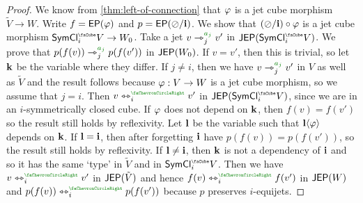 \documentclass[a4paper]{memoir}
\begin{document}
\begin{proof}
	We know from \cref{thm:left-of-connection} that $\varphi$ is a jet cube morphism $\tilde V \to W$.
	Write $f = \mathsf{EP}(\varphi)$ and $p = \mathsf{EP}(\oslash / \mathbf{i})$.
	We show that $(\oslash/\mathbf{i}) \circ \varphi$ is a jet cube morphism $\UFsymcube_i V \to W_0$.
	Take a jet $v \jet_j\pmr{a_j} v'$ in $\JEP(\UFsymcube_i V)$.
	We prove that $p(f(v)) \jet_j\pmr{a_j} p(f(v'))$ in $\mathsf{JEP}(W_0)$.
	If $v = v'$, then this is trivial, so let $\mathbf{k}$ be the variable where they differ.
	If $j \neq i$, then we have $v \jet_j\pmr{a_j} v'$ in $V$ as well as $\tilde V$ and the result follows because $\varphi : V \to W$ is a jet cube morphism, so we assume that $j = i$.
	Then $v \equijet_i\pmr{\ypolar} v'$ in $\JEP(\UFsymcube_i V)$, since we are in an $i$-symmetrically closed cube.
	If $\varphi$ does not depend on $\mathbf{k}$, then $f(v) = f(v')$ so the result still holds by reflexivity.
	Let $\mathbf{l}$ be the variable such that $\mathbf{l} \langle \varphi \rangle$ depends on $\mathbf{k}$.
	If $\mathbf{l} = \mathbf{i}$, then after forgetting $\mathbf{i}$ have $p(f(v)) = p(f(v'))$, so the result still holds by reflexivity.
	If $\mathbf{l} \neq \mathbf{i}$, then $\mathbf{k}$ is not a dependency of $\mathbf{i}$ and so it has the same `type' in $\tilde V$ and in $\UFsymcube_i V$.
	Then we have $v \equijet_i\pmr{\ypolar} v'$ in $\mathsf{JEP}(\tilde V)$ and hence $f(v) \equijet_i\pmr{\ypolar} f(v')$ in $\mathsf{JEP}(W)$ and $p(f(v)) \equijet_i\pmr{\ypolar} p(f(v'))$ because $p$ preserves $i$-equijets.
%	
%	
%	
\end{proof}
\end{document}
